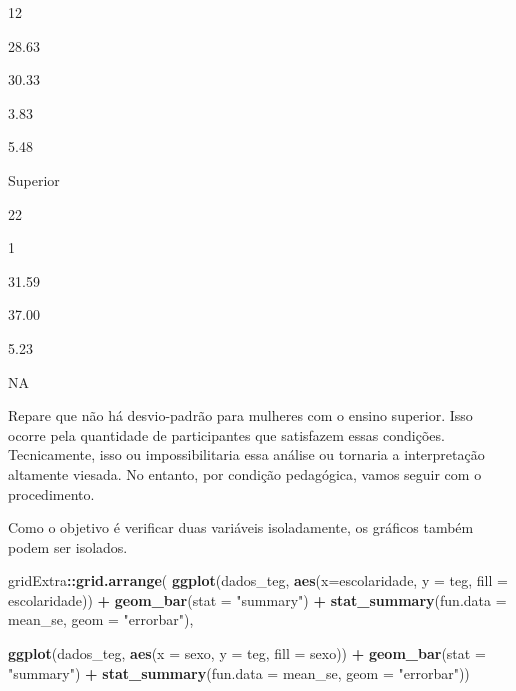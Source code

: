 \documentclass[
]{book}
\newenvironment{Shaded}{\begin{snugshade}}{\end{snugshade}}
\newcommand{\DataTypeTok}[1]{\textcolor[rgb]{0.13,0.29,0.53}{#1}}
\newcommand{\KeywordTok}[1]{\textcolor[rgb]{0.13,0.29,0.53}{\textbf{#1}}}
\newcommand{\NormalTok}[1]{#1}
\newcommand{\OperatorTok}[1]{\textcolor[rgb]{0.81,0.36,0.00}{\textbf{#1}}}
\newcommand{\StringTok}[1]{\textcolor[rgb]{0.31,0.60,0.02}{#1}}
\begin{document}
12

28.63

30.33

3.83

5.48

Superior

22

1

31.59

37.00

5.23

NA

Repare que não há desvio-padrão para mulheres com o ensino superior. Isso ocorre pela quantidade de participantes que satisfazem essas condições. Tecnicamente, isso ou impossibilitaria essa análise ou tornaria a interpretação altamente viesada. No entanto, por condição pedagógica, vamos seguir com o procedimento.

Como o objetivo é verificar duas variáveis isoladamente, os gráficos também podem ser isolados.

\begin{Shaded}
\begin{Highlighting}[]
\NormalTok{gridExtra}\OperatorTok{::}\KeywordTok{grid.arrange}\NormalTok{(}
  \KeywordTok{ggplot}\NormalTok{(dados_teg, }\KeywordTok{aes}\NormalTok{(}\DataTypeTok{x=}\NormalTok{escolaridade, }\DataTypeTok{y =}\NormalTok{ teg, }\DataTypeTok{fill =}\NormalTok{ escolaridade)) }\OperatorTok{+}
\StringTok{  }\KeywordTok{geom_bar}\NormalTok{(}\DataTypeTok{stat =} \StringTok{"summary"}\NormalTok{) }\OperatorTok{+}
\StringTok{  }\KeywordTok{stat_summary}\NormalTok{(}\DataTypeTok{fun.data =}\NormalTok{ mean_se, }\DataTypeTok{geom =} \StringTok{"errorbar"}\NormalTok{),}
  
  \KeywordTok{ggplot}\NormalTok{(dados_teg, }\KeywordTok{aes}\NormalTok{(}\DataTypeTok{x =}\NormalTok{ sexo, }\DataTypeTok{y =}\NormalTok{ teg, }\DataTypeTok{fill =}\NormalTok{ sexo)) }\OperatorTok{+}
\StringTok{  }\KeywordTok{geom_bar}\NormalTok{(}\DataTypeTok{stat =} \StringTok{"summary"}\NormalTok{) }\OperatorTok{+}
\StringTok{  }\KeywordTok{stat_summary}\NormalTok{(}\DataTypeTok{fun.data =}\NormalTok{ mean_se, }\DataTypeTok{geom =} \StringTok{"errorbar"}\NormalTok{))}
\end{Highlighting}
\end{Shaded}
\end{document}
